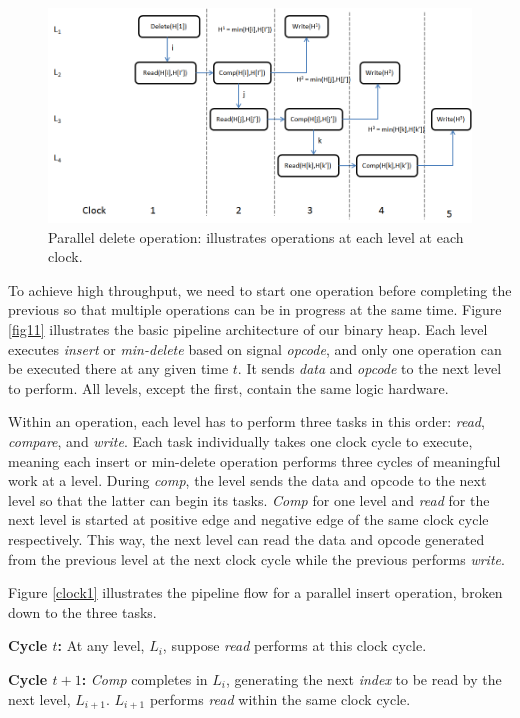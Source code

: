 \begin{figure}[!ht]
  \centering
  \includegraphics[width=12cm]{fig/clock2.png}
      \caption{Parallel delete operation: illustrates operations at each level at each clock.  }
    \label{clock2}
\end{figure}

To achieve high throughput, we need to start one operation before completing the previous so that multiple operations can be in progress at the same time.
Figure \ref{fig11} illustrates the basic pipeline architecture of our binary heap.
Each level executes {\it insert} or {\it min-delete} based on signal {\it opcode}, and only one operation can be executed there at any given time $t$.
It sends {\it data} and {\it opcode} to the next level to perform.
All levels, except the first, contain the same logic hardware.

Within an operation, each level has to perform three tasks in this order: {\it read}, {\it compare}, and {\it write}.
Each task individually takes one clock cycle to execute, meaning each insert or min-delete operation performs three cycles of meaningful work at a level.
During {\it comp}, the level sends the data and opcode to the next level so that the latter can begin its tasks.
{\it Comp} for one level and {\it read} for the next level is started at positive edge and negative edge of the same clock cycle respectively. This way, the next level can read the data and opcode generated from the previous level at the next clock cycle while the previous performs {\it write}.


Figure \ref{clock1} illustrates the pipeline flow for a parallel insert operation, broken down to the three tasks.

{\bf Cycle $t$:} At any level, $L_i$, suppose {\it read} performs at this clock cycle.

{\bf Cycle $t+1$:} {\it Comp} completes in $L_i$, generating the next {\it index} to be read by the next level, $L_{i+1}$. $L_{i+1}$ performs {\it read} within the same clock cycle.

